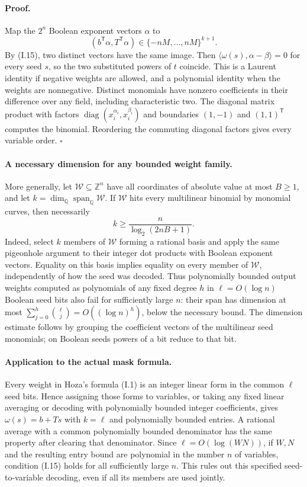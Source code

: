 \documentclass[11pt,a4paper]{article}
\theoremstyle{definition}\newtheorem{definition}{Definition}
\begin{document}
\paragraph{Proof.}
Map the $2^n$ Boolean exponent vectors $\alpha$ to
\[
 \left(b^{\mathsf T}\alpha,T^{\mathsf T}\alpha\right)\in
 \{-nM,\ldots,nM\}^{k+1}.
\]
By (I.15), two distinct vectors have the same image.  Then
$\langle\omega(s),\alpha-\beta\rangle=0$ for every seed $s$,
so the two substituted powers of $t$ coincide.  This is a Laurent
identity if negative weights are allowed, and a polynomial identity
when the weights are nonnegative.  Distinct monomials have nonzero
coefficients in their difference over any field, including
characteristic two.  The diagonal matrix product with factors
$\operatorname{diag}(x_i^{\alpha_i},x_i^{\beta_i})$ and boundaries
$(1,-1)$ and $(1,1)^{\mathsf T}$ computes the binomial.  Reordering
the commuting diagonal factors gives every variable order.
\hfill$\square$

\paragraph{A necessary dimension for any bounded weight family.}
More generally, let $\mathcal W\subseteq\mathbb Z^n$ have all
coordinates of absolute value at most $B\ge1$, and let
$k=\dim_{\mathbb Q}\operatorname{span}_{\mathbb Q}\mathcal W$.
If $\mathcal W$ hits every multilinear binomial by monomial curves,
then necessarily
\[
 k\ge\frac{n}{\log_2(2nB+1)}.
\]
Indeed, select $k$ members of $\mathcal W$ forming a rational basis
and apply the same pigeonhole argument to their integer dot products
with Boolean exponent vectors.  Equality on this basis implies
equality on every member of $\mathcal W$, independently of how
the seed was decoded.  Thus polynomially bounded output weights
computed as polynomials of any fixed degree $h$ in
$\ell=O(\log n)$ Boolean seed bits also fail for sufficiently large
$n$: their span has dimension at most
$\sum_{j=0}^h\binom{\ell}{j}=O((\log n)^h)$, below the necessary
bound.  The dimension estimate follows by grouping the coefficient
vectors of the multilinear seed monomials; on Boolean seeds powers
of a bit reduce to that bit.

\paragraph{Application to the actual mask formula.}
Every weight in Hoza's formula (I.1) is an integer linear form in
the common $\ell$ seed bits.  Hence assigning those forms to
variables, or taking any fixed linear averaging or decoding with
polynomially bounded integer coefficients, gives $\omega(s)=b+Ts$
with $k=\ell$ and polynomially bounded entries.  A rational average
with a common polynomially bounded denominator has the same property
after clearing that denominator.  Since $\ell=O(\log(WN))$, if
$W,N$ and the resulting entry bound are polynomial in the number
$n$ of variables, condition (I.15) holds for all sufficiently large
$n$.  This rules out this specified seed-to-variable decoding,
even if all its members are used jointly.
\end{document}
